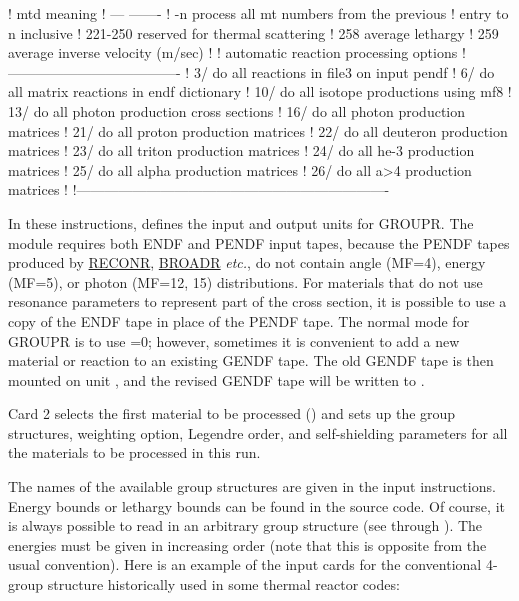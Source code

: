 \begin{ccode}
   !     mtd          meaning
   !     ---          -------
   !     -n           process all mt numbers from the previous
   !                          entry to n inclusive
   !     221-250      reserved for thermal scattering
   !     258          average lethargy
   !     259          average inverse velocity (m/sec)
   !
   !     automatic reaction processing options
   !     -------------------------------------
   !        3/        do all reactions in file3 on input pendf
   !        6/        do all matrix reactions in endf dictionary
   !       10/        do all isotope productions using mf8
   !       13/        do all photon production cross sections
   !       16/        do all photon production matrices
   !       21/        do all proton production matrices
   !       22/        do all deuteron production matrices
   !       23/        do all triton production matrices
   !       24/        do all he-3 production matrices
   !       25/        do all alpha production matrices
   !       26/        do all a>4 production matrices
   !
   !-------------------------------------------------------------------

\end{ccode}
\normalsize

In these instructions,  defines the input and output units
for GROUPR.  The module requires both ENDF and PENDF input tapes,
because the PENDF tapes produced by
\hyperlink{sRECONRhy}{RECONR},
\hyperlink{sBROADRhy}{BROADR} {\it etc.}, do not
contain angle (MF=4),
energy (MF=5), or photon (MF=12, 15) distributions.  For materials
that do not use resonance parameters to represent part of the
cross section, it is possible to use a copy of the ENDF tape in place
of the PENDF tape.  The normal mode for GROUPR is to use =0;
however, sometimes it is convenient to add a new material or reaction to
an existing GENDF tape.  The old GENDF tape is then mounted on unit
, and the revised GENDF tape will be written to .

Card 2 selects the first material to be processed () and sets
up the group structures,
weighting option, Legendre order, and
self-shielding parameters for all the materials
to be processed in this run.

The names of the available group structures are given in the input
instructions. Energy bounds or lethargy bounds can be found in the
source code.  Of course, it is always possible to read in an arbitrary
group structure (see  through ).  The energies
must be given in increasing order (note that this is opposite from the
usual convention).  Here is an example of the input cards for the
conventional 4-group structure historically used in some thermal
reactor codes:

